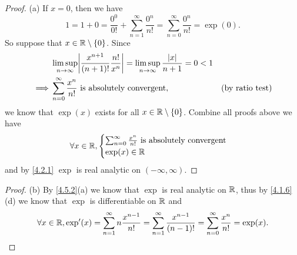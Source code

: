 \begin{proof}{(a)}
  If \(x = 0\), then we have
  \[
    1 = 1 + 0 = \frac{0^0}{0!} + \sum_{n = 1}^\infty \frac{0^n}{n!} = \sum_{n = 0}^\infty \frac{0^n}{n!} = \exp(0).
  \]
  So suppose that \(x \in \mathbb{R} \setminus \{0\}\).
  Since
  \begin{align*}
             & \limsup_{n \to \infty} \abs{\frac{x^{n + 1}}{(n + 1)!} \frac{n!}{x^n}} = \limsup_{n \to \infty} \frac{\abs{x}}{n + 1} = 0 < 1                          \\
    \implies & \sum_{n = 0}^\infty \frac{x^n}{n!} \text{ is absolutely convergent},                                                          & \text{(by ratio test)}
  \end{align*}
  we know that \(\exp(x)\) exists for all \(x \in \mathbb{R} \setminus \{0\}\).
  Combine all proofs above we have
  \[
    \forall x \in \mathbb{R}, \begin{cases}
      \sum_{n = 0}^\infty \frac{x^n}{n!} \text{ is absolutely convergent} \\
      \exp(x) \in \mathbb{R}
    \end{cases}
  \]
  and by \cref{4.2.1} \(\exp\) is real analytic on \((-\infty, \infty)\).
\end{proof}

\begin{proof}{(b)}
  By \cref{4.5.2}(a) we know that \(\exp\) is real analytic on \(\mathbb{R}\), thus by \cref{4.1.6}(d) we know that \(\exp\) is differentiable on \(\mathbb{R}\) and
  \[
    \forall x \in \mathbb{R}, \exp'(x) = \sum_{n = 1}^\infty n \frac{x^{n - 1}}{n!} = \sum_{n = 1}^\infty \frac{x^{n - 1}}{(n - 1)!} = \sum_{n = 0}^\infty \frac{x^n}{n!} = \exp(x).
  \]
\end{proof}


